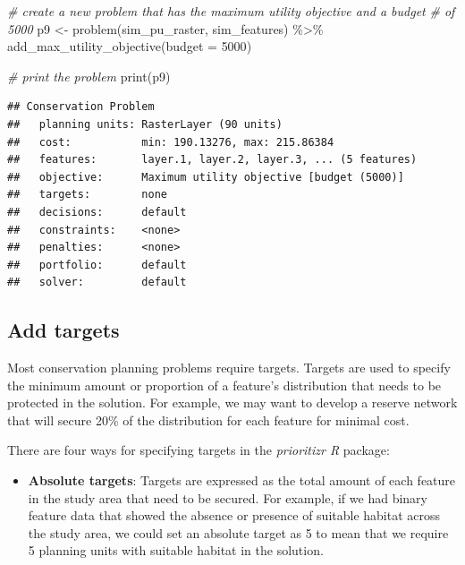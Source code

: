 \documentclass[
  12pt,
]{book}
\newenvironment{Shaded}{\begin{snugshade}}{\end{snugshade}}
\newcommand{\AttributeTok}[1]{\textcolor[rgb]{0.77,0.63,0.00}{#1}}
\newcommand{\CommentTok}[1]{\textcolor[rgb]{0.56,0.35,0.01}{\textit{#1}}}
\newcommand{\DecValTok}[1]{\textcolor[rgb]{0.00,0.00,0.81}{#1}}
\newcommand{\FunctionTok}[1]{\textcolor[rgb]{0.00,0.00,0.00}{#1}}
\newcommand{\NormalTok}[1]{#1}
\newcommand{\OtherTok}[1]{\textcolor[rgb]{0.56,0.35,0.01}{#1}}
\newcommand{\SpecialCharTok}[1]{\textcolor[rgb]{0.00,0.00,0.00}{#1}}
\providecommand{\tightlist}{%
  \setlength{\itemsep}{0pt}\setlength{\parskip}{0pt}}
\begin{document}
\begin{Shaded}
\begin{Highlighting}[]
\CommentTok{\# create a new problem that has the maximum utility objective and a budget}
\CommentTok{\# of 5000}
\NormalTok{p9 }\OtherTok{\textless{}{-}} \FunctionTok{problem}\NormalTok{(sim\_pu\_raster, sim\_features) }\SpecialCharTok{\%\textgreater{}\%}
      \FunctionTok{add\_max\_utility\_objective}\NormalTok{(}\AttributeTok{budget =} \DecValTok{5000}\NormalTok{)}

\CommentTok{\# print the problem}
\FunctionTok{print}\NormalTok{(p9)}
\end{Highlighting}
\end{Shaded}

\begin{verbatim}
## Conservation Problem
##   planning units: RasterLayer (90 units)
##   cost:           min: 190.13276, max: 215.86384
##   features:       layer.1, layer.2, layer.3, ... (5 features)
##   objective:      Maximum utility objective [budget (5000)]
##   targets:        none
##   decisions:      default
##   constraints:    <none>
##   penalties:      <none>
##   portfolio:      default
##   solver:         default
\end{verbatim}

\hypertarget{add-targets}{%
\subsection{Add targets}\label{add-targets}}

Most conservation planning problems require targets. Targets are used to specify the minimum amount or proportion of a feature's distribution that needs to be protected in the solution. For example, we may want to develop a reserve network that will secure 20\% of the distribution for each feature for minimal cost.

There are four ways for specifying targets in the \emph{prioritizr R} package:

\begin{itemize}
\tightlist
\item
  \textbf{Absolute targets}: Targets are expressed as the total amount of each feature in the study area that need to be secured. For example, if we had binary feature data that showed the absence or presence of suitable habitat across the study area, we could set an absolute target as 5 to mean that we require 5 planning units with suitable habitat in the solution.
\end{itemize}
\end{document}
